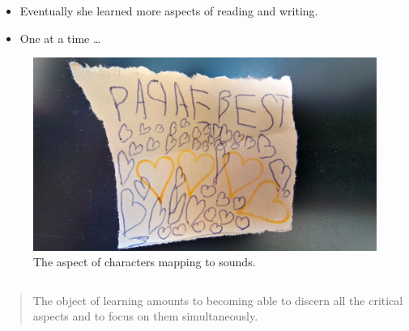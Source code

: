 \begin{frame}
  \begin{remark}
    \begin{itemize}
      \item Eventually she learned more aspects of reading and writing.
      \item One at a time \dots
    \end{itemize}
  \end{remark}

  \begin{figure}
    \includegraphics[height=0.5\textheight]{fig/papaebest.jpg}
    \caption{The aspect of characters mapping to sounds.}
  \end{figure}
\end{frame}

\begin{frame}[fragile]
  \begin{example}[Programming]
    \inputminted{python}{scope.py}
  \end{example}
\end{frame}

\begin{frame}
  \blockcquote[p.~37]{NecessaryConditionsOfLearning}
  {%
    The object of learning \textelp{} amounts to becoming able to discern all 
    the critical aspects and to focus on them simultaneously.%
  }
\end{frame}

